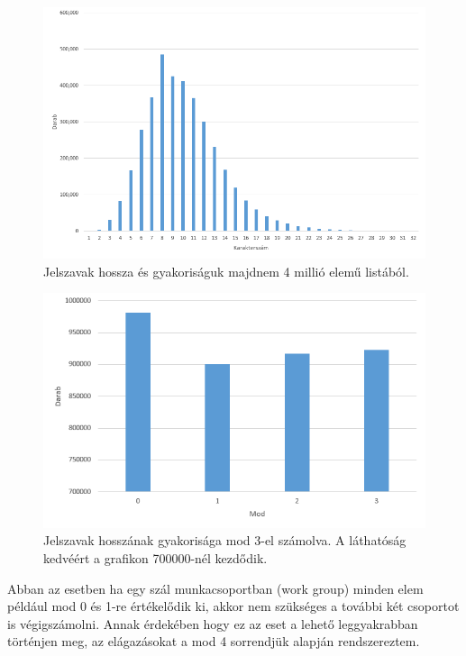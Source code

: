 \begin{figure}[H]
    \centering
    \includegraphics[width=\textwidth]{images/charts/passwords-by-length.png}
    \caption{Jelszavak hossza és gyakoriságuk majdnem 4 millió elemű listából.}
\end{figure}

\begin{figure}[H]
    \centering
    \includegraphics[width=\textwidth]{images/charts/passwords-by-length-group.png}
    \caption{Jelszavak hosszának gyakorisága mod 3-el számolva. A láthatóság kedvéért a grafikon \num{700000}-nél kezdődik.}
\end{figure}

Abban az esetben ha egy szál munkacsoportban (work group) minden elem például mod 0 és 1-re értékelődik ki, akkor nem szükséges a további két csoportot is végigszámolni. Annak érdekében hogy ez az eset a lehető leggyakrabban történjen meg, az elágazásokat a mod 4 sorrendjük alapján rendszereztem.




